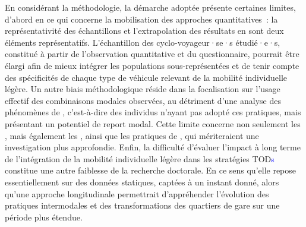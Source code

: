\begin{refsegment}
En considérant la méthodologie, la démarche adoptée présente certaines limites, d'abord en ce qui concerne la mobilisation des approches quantitatives~: la représentativité des échantillons et l’extrapolation des résultats en sont deux éléments représentatifs. L’échantillon des cyclo-voyageur·se·s étudié·e·s, constitué à partir de l'observation quantitative et du questionnaire, pourrait être élargi afin de mieux intégrer les populations sous-représentées et de tenir compte des spécificités de chaque type de véhicule relevant de la mobilité individuelle légère. Un autre biais méthodologique réside dans la focalisation sur l’usage effectif des combinaisons modales observées, au détriment d’une analyse des phénomènes de , c’est-à-dire des individus n’ayant pas adopté ces pratiques, mais présentant un potentiel de report modal. Cette limite concerne non seulement les , mais également les , ainsi que les pratiques de , qui mériteraient une investigation plus approfondie. Enfin, la difficulté d’évaluer l’impact à long terme de l’intégration de la mobilité individuelle légère dans les stratégies \acrshort{TOD}\textcolor{blue}{s} constitue une autre faiblesse de la recherche doctorale. En ce sens qu'elle repose essentiellement sur des données statiques, captées à un instant donné, alors qu’une approche longitudinale permettrait d’appréhender l’évolution des pratiques intermodales et des transformations des quartiers de gare sur une période plus étendue.%


\end{refsegment}
